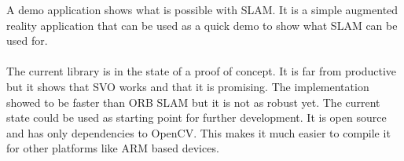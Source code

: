 \documentclass[11pt,a4paper,titlepage,oneside]{report}
\begin{document}
A demo application shows what is possible with SLAM. It is a simple augmented reality application that can be used as a quick demo to show what SLAM can be used for.\\\\
The current library is in the state of a proof of concept. It is far from productive but it shows that SVO works and that it is promising. The implementation showed to be faster than ORB SLAM but it is not as robust yet. The current state could be used as starting point for further development. It is open source and has only dependencies to OpenCV. This makes it much easier to compile it for other platforms like ARM based devices.

\printbibliography
\end{document}
